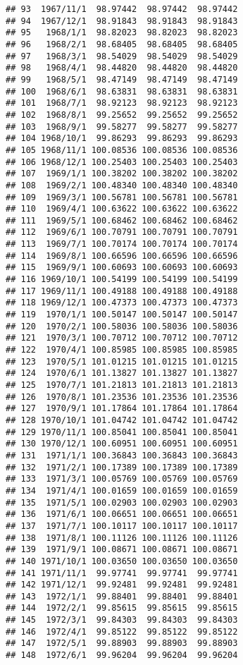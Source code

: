 \documentclass[
]{article}
\begin{document}
\begin{verbatim}
## 93  1967/11/1  98.97442  98.97442  98.97442
## 94  1967/12/1  98.91843  98.91843  98.91843
## 95   1968/1/1  98.82023  98.82023  98.82023
## 96   1968/2/1  98.68405  98.68405  98.68405
## 97   1968/3/1  98.54029  98.54029  98.54029
## 98   1968/4/1  98.44820  98.44820  98.44820
## 99   1968/5/1  98.47149  98.47149  98.47149
## 100  1968/6/1  98.63831  98.63831  98.63831
## 101  1968/7/1  98.92123  98.92123  98.92123
## 102  1968/8/1  99.25652  99.25652  99.25652
## 103  1968/9/1  99.58277  99.58277  99.58277
## 104 1968/10/1  99.86293  99.86293  99.86293
## 105 1968/11/1 100.08536 100.08536 100.08536
## 106 1968/12/1 100.25403 100.25403 100.25403
## 107  1969/1/1 100.38202 100.38202 100.38202
## 108  1969/2/1 100.48340 100.48340 100.48340
## 109  1969/3/1 100.56781 100.56781 100.56781
## 110  1969/4/1 100.63622 100.63622 100.63622
## 111  1969/5/1 100.68462 100.68462 100.68462
## 112  1969/6/1 100.70791 100.70791 100.70791
## 113  1969/7/1 100.70174 100.70174 100.70174
## 114  1969/8/1 100.66596 100.66596 100.66596
## 115  1969/9/1 100.60693 100.60693 100.60693
## 116 1969/10/1 100.54199 100.54199 100.54199
## 117 1969/11/1 100.49188 100.49188 100.49188
## 118 1969/12/1 100.47373 100.47373 100.47373
## 119  1970/1/1 100.50147 100.50147 100.50147
## 120  1970/2/1 100.58036 100.58036 100.58036
## 121  1970/3/1 100.70712 100.70712 100.70712
## 122  1970/4/1 100.85985 100.85985 100.85985
## 123  1970/5/1 101.01215 101.01215 101.01215
## 124  1970/6/1 101.13827 101.13827 101.13827
## 125  1970/7/1 101.21813 101.21813 101.21813
## 126  1970/8/1 101.23536 101.23536 101.23536
## 127  1970/9/1 101.17864 101.17864 101.17864
## 128 1970/10/1 101.04742 101.04742 101.04742
## 129 1970/11/1 100.85041 100.85041 100.85041
## 130 1970/12/1 100.60951 100.60951 100.60951
## 131  1971/1/1 100.36843 100.36843 100.36843
## 132  1971/2/1 100.17389 100.17389 100.17389
## 133  1971/3/1 100.05769 100.05769 100.05769
## 134  1971/4/1 100.01659 100.01659 100.01659
## 135  1971/5/1 100.02903 100.02903 100.02903
## 136  1971/6/1 100.06651 100.06651 100.06651
## 137  1971/7/1 100.10117 100.10117 100.10117
## 138  1971/8/1 100.11126 100.11126 100.11126
## 139  1971/9/1 100.08671 100.08671 100.08671
## 140 1971/10/1 100.03650 100.03650 100.03650
## 141 1971/11/1  99.97741  99.97741  99.97741
## 142 1971/12/1  99.92481  99.92481  99.92481
## 143  1972/1/1  99.88401  99.88401  99.88401
## 144  1972/2/1  99.85615  99.85615  99.85615
## 145  1972/3/1  99.84303  99.84303  99.84303
## 146  1972/4/1  99.85122  99.85122  99.85122
## 147  1972/5/1  99.88903  99.88903  99.88903
## 148  1972/6/1  99.96204  99.96204  99.96204

\end{verbatim}
\end{document}
